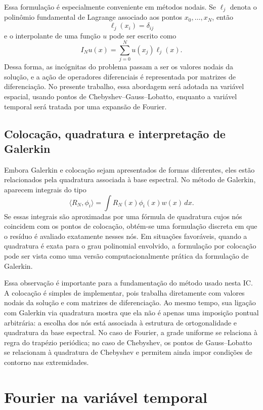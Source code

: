 Essa formulação é especialmente conveniente em métodos nodais. Se \(\ell_j\) denota o polinômio fundamental de Lagrange associado aos pontos \(x_0,\dots,x_N\), então
\[
\ell_j(x_i)=\delta_{ij}
\]
e o interpolante de uma função \(u\) pode ser escrito como
\[
I_Nu(x)=\sum_{j=0}^{N}u(x_j)\ell_j(x).
\]
Dessa forma, as incógnitas do problema passam a ser os valores nodais da solução, e a ação de operadores diferenciais é representada por matrizes de diferenciação. No presente trabalho, essa abordagem será adotada na variável espacial, usando pontos de Chebyshev--Gauss--Lobatto, enquanto a variável temporal será tratada por uma expansão de Fourier.


\subsection{Colocação, quadratura e interpretação de Galerkin}
\label{subsec:colocacao-quadratura}

Embora Galerkin e colocação sejam apresentados de formas diferentes, eles estão relacionados pela quadratura associada à base espectral. No método de Galerkin, aparecem integrais do tipo
\[
\langle R_N,\phi_i\rangle=
\int R_N(x)\phi_i(x)w(x)\,dx.
\]
Se essas integrais são aproximadas por uma fórmula de quadratura cujos nós coincidem com os pontos de colocação, obtém-se uma formulação discreta em que o resíduo é avaliado exatamente nesses nós. Em situações favoráveis, quando a quadratura é exata para o grau polinomial envolvido, a formulação por colocação pode ser vista como uma versão computacionalmente prática da formulação de Galerkin.

Essa observação é importante para a fundamentação do método usado nesta IC. A colocação é simples de implementar, pois trabalha diretamente com valores nodais da solução e com matrizes de diferenciação. Ao mesmo tempo, sua ligação com Galerkin via quadratura mostra que ela não é apenas uma imposição pontual arbitrária: a escolha dos nós está associada à estrutura de ortogonalidade e quadratura da base espectral. No caso de Fourier, a grade uniforme se relaciona à regra do trapézio periódica; no caso de Chebyshev, os pontos de Gauss--Lobatto se relacionam à quadratura de Chebyshev e permitem ainda impor condições de contorno nas extremidades.

\section{Fourier na variável temporal}

